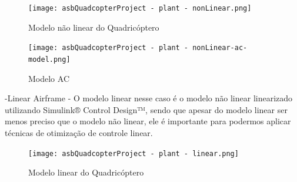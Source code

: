 \begin{figure}[H]
	\centering
	\texttt{[image: asbQuadcopterProject - plant - nonLinear.png]}
	\caption{Modelo não linear do Quadricóptero}
	\centering
	\label{Modelo não linear do Quadricóptero}
\end{figure}


\begin{figure}[H]
	\centering
	\texttt{[image: asbQuadcopterProject - plant - nonLinear-ac-model.png]}
	\caption{Modelo AC}
	\centering
	\label{Modelo AC}
\end{figure}



-Linear Airframe - O modelo linear nesse caso é o modelo não linear linearizado utilizando  Simulink® Control Design™, sendo que apesar do modelo linear ser menos preciso que o modelo não linear, ele é importante para podermos aplicar técnicas de otimização de controle linear.

\begin{figure}[H]
	\centering
	\texttt{[image: asbQuadcopterProject - plant - linear.png]}
	\caption{Modelo linear do Quadricóptero}
	\centering
	\label{Modelo linear do Quadricóptero}
\end{figure}
\printindex
